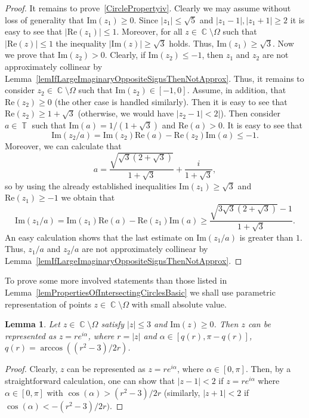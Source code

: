 \documentclass{amsart}
\numberwithin{equation}{section}
\newtheorem{lemma}[theorem]{Lemma}
\theoremstyle{definition}
\theoremstyle{remark}
\DeclareMathOperator{\CC}{\mathbb C}
\DeclareMathOperator{\TT}{\mathbb T}
\begin{document}
\begin{proof}
		It remains to prove~\ref{CirclePropertyiv}. Clearly we may assume without loss of generality that $\mathrm{Im}(z_1) \ge 0$. Since $|z_1| \le \sqrt{5}$ and $|z_1 - 1|, |z_1 + 1| \ge 2$ it is easy to see that $|\mathrm{Re}(z_1)| \le 1$. Moreover, for all $z \in \CC \setminus \Omega$ such that $|\mathrm{Re}(z)| \le 1$ the inequality $|\mathrm{Im}(z)| \ge \sqrt{3}$ holds. Thus, $\mathrm{Im}(z_1) \ge \sqrt{3}$. Now we prove that $\mathrm{Im}(z_2) > 0$. Clearly, if $\mathrm{Im}(z_2) \le -1$, then $z_1$ and $z_2$ are not approximately collinear by Lemma~\ref{lemIfLargeImaginaryOppositeSignsThenNotApprox}. Thus, it remains to consider $z_2 \in \CC \setminus \Omega$ such that $\mathrm{Im}(z_2) \in [-1, 0]$. Assume, in addition, that $\mathrm{Re}(z_2) \ge 0$ (the other case is handled similarly). Then it is easy to see that $\mathrm{Re}(z_2) \ge 1 + \sqrt{3}$ (otherwise, we would have $|z_2 - 1| < 2|$). Then consider $a \in \TT$ such that $\mathrm{Im}(a) = 1/(1 + \sqrt{3})$ and $\mathrm{Re}(a) > 0$. It is easy to see that
		\[
		\mathrm{Im}(z_2/a) = \mathrm{Im}(z_2)\mathrm{Re}(a) - \mathrm{Re}(z_2)\mathrm{Im}(a) \le -1.
		\]
		Moreover, we can calculate that 
		\[
		a = \dfrac{\sqrt{\sqrt{3}(2+\sqrt{3})}}{1 + \sqrt{3}} + \dfrac{i}{1 + \sqrt{3}},
		\]
		so by using the already established inequalities $\mathrm{Im}(z_1) \ge \sqrt{3}$ and $\mathrm{Re}(z_1) \ge -1$ we obtain that
		\[
		\mathrm{Im}(z_1/a) = \mathrm{Im}(z_1)\mathrm{Re}(a) - \mathrm{Re}(z_1)\mathrm{Im}(a) \ge \dfrac{\sqrt{3\sqrt{3}(2+\sqrt{3})} - 1}{1 + \sqrt{3}}.
		\]
		An easy calculation shows that the last estimate on $\mathrm{Im}(z_1/a)$ is greater than $1$. Thus, $z_1/a$ and $z_2/a$ are not approximately collinear by Lemma~\ref{lemIfLargeImaginaryOppositeSignsThenNotApprox}.
	\end{proof}
	
	To prove some more involved statements than those listed in Lemma~\ref{lemPropertiesOfIntersectingCirclesBasic} we shall use parametric representation of points $z \in \CC \setminus \Omega$ with small absolute value.
	\begin{lemma}\label{lemAnglesOfSmallAbsoluteValuesOutsideOmega}
		Let $z \in \CC \setminus \Omega$ satisfy $|z| \le 3$ and $\mathrm{Im}(z) \ge 0$. Then $z$ can be represented as $z = re^{i\alpha}$, where $r = |z|$ and $\alpha \in [q(r), \pi - q(r)]$, $q(r) = \arccos((r^2 - 3)/2r)$.
	\end{lemma}
	\begin{proof}
		Clearly, $z$ can be represented as $z = re^{i\alpha}$, where $\alpha \in [0, \pi]$.
		Then, by a straightforward calculation, one can show that $|z - 1| < 2$ if $z = re^{i\alpha}$ where $\alpha \in [0,\pi]$ with $\cos(\alpha) > (r^2 - 3)/2r$ (similarly, $|z + 1| < 2$ if $\cos(\alpha) < -(r^2 - 3)/2r)$.
	\end{proof}
	
\end{document}
